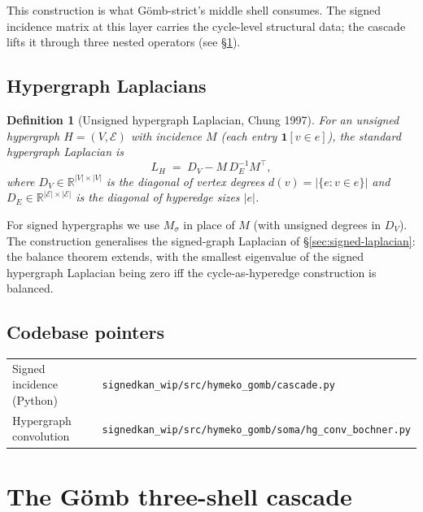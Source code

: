 \documentclass[11pt,a4paper]{article}
\newtheorem{definition}[theorem]{Definition}
\theoremstyle{remark}
\newcommand{\R}{\mathbb{R}}
\newcommand{\GS}{G\"omb}
\newcommand{\indic}[1]{\mathbf{1}\!\left[#1\right]}
\begin{document}
This construction is what \GS{}-strict's middle shell consumes.
The signed incidence matrix at this layer carries the cycle-level
structural data; the cascade lifts it through three nested
operators (see \S\ref{sec:gomb-cascade}).

\subsection{Hypergraph Laplacians}

\begin{definition}[Unsigned hypergraph Laplacian, Chung 1997]
For an unsigned hypergraph $H = (V, \mathcal{E})$ with incidence
$M$ (each entry $\indic{v \in e}$), the standard hypergraph
Laplacian is
\[
  L_H \;=\; D_V - M \, D_E^{-1} M^\top,
\]
where $D_V \in \R^{|V| \times |V|}$ is the diagonal of vertex
degrees $d(v) = |\{e : v \in e\}|$ and $D_E \in
\R^{|\mathcal{E}| \times |\mathcal{E}|}$ is the diagonal of
hyperedge sizes $|e|$.
\end{definition}

For signed hypergraphs we use $M_\sigma$ in place of $M$ (with
unsigned degrees in $D_V$). The construction generalises the
signed-graph Laplacian of \S\ref{sec:signed-laplacian}: the
balance theorem extends, with the smallest eigenvalue of the
signed hypergraph Laplacian being zero iff the cycle-as-hyperedge
construction is balanced.

\subsection{Codebase pointers}

\begin{tabular}{ll}
Signed incidence (Python) & \texttt{signedkan\_wip/src/hymeko\_gomb/cascade.py} \\
Hypergraph convolution & \texttt{signedkan\_wip/src/hymeko\_gomb/soma/hg\_conv\_bochner.py} \\
\end{tabular}

\section{The G\"omb three-shell cascade}\label{sec:gomb-cascade}
\end{document}
